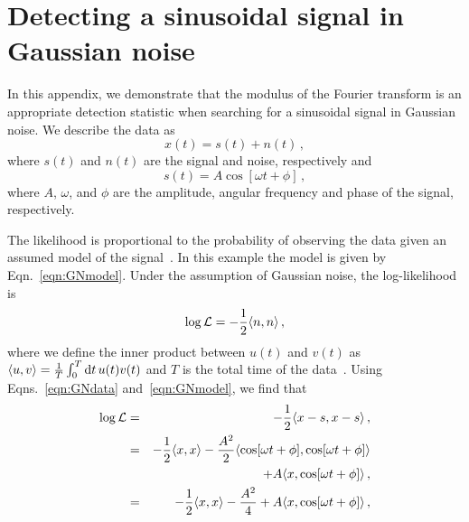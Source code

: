 \documentclass[paper-main.tex]{subfiles}
\begin{document}
\section{Detecting a sinusoidal signal in Gaussian noise}
\label{app:sinusoid_likelihood}
In this appendix, we demonstrate that the modulus of the Fourier transform is an appropriate detection statistic when searching for a sinusoidal signal in Gaussian noise. 
We describe the data as
\begin{equation}
x(t) = s(t) + n(t)\,, 
\label{eqn:GNdata}
\end{equation}
where $s(t)$ and $n(t)$ are the signal and noise, respectively and  
\begin{equation}
s(t) = A \cos\left[{\omega t + \phi}\right]\,,
\label{eqn:GNmodel}
\end{equation}
where $A$, $\omega$, and $\phi$ are the amplitude, angular frequency and phase of the signal, respectively. 

The likelihood is proportional to the probability of observing the data given an assumed model of the signal~\cite{Jaynes:2003}.
In this example the model is given by Eqn.~\ref{eqn:GNmodel}.
Under the assumption of Gaussian noise, the log-likelihood is 
\begin{equation}
\log \mathcal{L} = -\frac{1}{2}\langle n,n \rangle\,, 
\end{equation}
where we define the inner product between $u(t)$ and $v(t)$ as $\langle u,v \rangle = \frac{1}{T} \int_0^T \mathrm{d} t \, u(t) v(t) $ and $T$ is the total time of the data~\cite{JKS:1998}. 
Using Eqns.~\ref{eqn:GNdata} and~\ref{eqn:GNmodel}, we find that
\begin{eqnarray}
\log \mathcal{L} &=& -\frac{1}{2}\langle x-s,x-s \rangle\,, \\ 
                 &=& -\frac{1}{2}\langle x,x \rangle - \frac{A^2}{2} \langle \cos[\omega t + \phi],\cos[\omega t + \phi] \rangle \nonumber\\
                 &&+ A \langle x,\cos[\omega t + \phi] \rangle\,,\\ 
                 &=& -\frac{1}{2}\langle x,x \rangle - \frac{A^2}{4} + A \langle x,\cos[\omega t + \phi] \rangle\,,\label{eqn:logLike}
\end{eqnarray}
\end{document}
